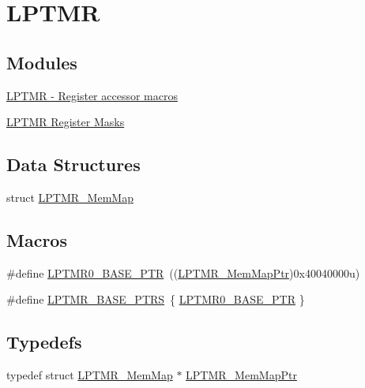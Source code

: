 \hypertarget{group___l_p_t_m_r___peripheral}{}\section{L\+P\+T\+MR}
\label{group___l_p_t_m_r___peripheral}
\subsection*{Modules}
\begin{DoxyCompactItemize}
\item 
\hyperlink{group___l_p_t_m_r___register___accessor___macros}{L\+P\+T\+M\+R -\/ Register accessor macros}
\item 
\hyperlink{group___l_p_t_m_r___register___masks}{L\+P\+T\+M\+R Register Masks}
\end{DoxyCompactItemize}
\subsection*{Data Structures}
\begin{DoxyCompactItemize}
\item 
struct \hyperlink{struct_l_p_t_m_r___mem_map}{L\+P\+T\+M\+R\+\_\+\+Mem\+Map}
\end{DoxyCompactItemize}
\subsection*{Macros}
\begin{DoxyCompactItemize}
\item 
\#define \hyperlink{group___l_p_t_m_r___peripheral_ga90a9194151ad11b422bcab162e797eda}{L\+P\+T\+M\+R0\+\_\+\+B\+A\+S\+E\+\_\+\+P\+TR}~((\hyperlink{group___l_p_t_m_r___peripheral_ga765226e2eeb35160c12820d4a2541320}{L\+P\+T\+M\+R\+\_\+\+Mem\+Map\+Ptr})0x40040000u)
\item 
\#define \hyperlink{group___l_p_t_m_r___peripheral_gac92660dedc63be48d689d43efc9f2c82}{L\+P\+T\+M\+R\+\_\+\+B\+A\+S\+E\+\_\+\+P\+T\+RS}~\{ \hyperlink{group___l_p_t_m_r___peripheral_ga90a9194151ad11b422bcab162e797eda}{L\+P\+T\+M\+R0\+\_\+\+B\+A\+S\+E\+\_\+\+P\+TR} \}
\end{DoxyCompactItemize}
\subsection*{Typedefs}
\begin{DoxyCompactItemize}
\item 
typedef struct \hyperlink{struct_l_p_t_m_r___mem_map}{L\+P\+T\+M\+R\+\_\+\+Mem\+Map} $\ast$ \hyperlink{group___l_p_t_m_r___peripheral_ga765226e2eeb35160c12820d4a2541320}{L\+P\+T\+M\+R\+\_\+\+Mem\+Map\+Ptr}
\end{DoxyCompactItemize}


